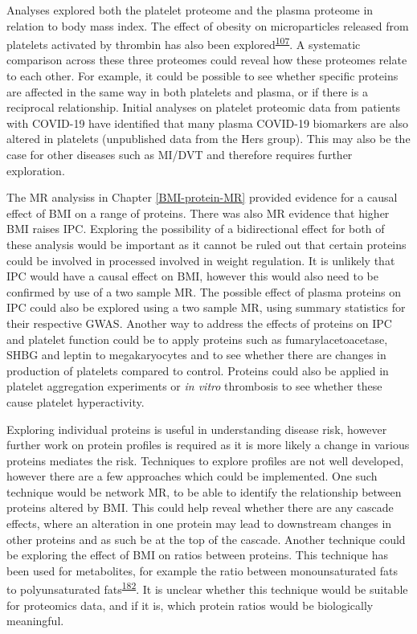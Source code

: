 \documentclass[11pt,twoside]{bristolthesis}
\begin{document}
Analyses explored both the platelet proteome and the plasma proteome in relation to body mass index. The effect of obesity on microparticles released from platelets activated by thrombin has also been explored\textsuperscript{\protect\hyperlink{ref-Grande2019}{107}}. A systematic comparison across these three proteomes could reveal how these proteomes relate to each other. For example, it could be possible to see whether specific proteins are affected in the same way in both platelets and plasma, or if there is a reciprocal relationship. Initial analyses on platelet proteomic data from patients with COVID-19 have identified that many plasma COVID-19 biomarkers are also altered in platelets (unpublished data from the Hers group). This may also be the case for other diseases such as MI/DVT and therefore requires further exploration.

The MR analysiss in Chapter \ref{BMI-protein-MR} provided evidence for a causal effect of BMI on a range of proteins. There was also MR evidence that higher BMI raises IPC. Exploring the possibility of a bidirectional effect for both of these analysis would be important as it cannot be ruled out that certain proteins could be involved in processed involved in weight regulation. It is unlikely that IPC would have a causal effect on BMI, however this would also need to be confirmed by use of a two sample MR. The possible effect of plasma proteins on IPC could also be explored using a two sample MR, using summary statistics for their respective GWAS. Another way to address the effects of proteins on IPC and platelet function could be to apply proteins such as fumarylacetoacetase, SHBG and leptin to megakaryocytes and to see whether there are changes in production of platelets compared to control. Proteins could also be applied in platelet aggregation experiments or \emph{in vitro} thrombosis to see whether these cause platelet hyperactivity.

Exploring individual proteins is useful in understanding disease risk, however further work on protein profiles is required as it is more likely a change in various proteins mediates the risk. Techniques to explore profiles are not well developed, however there are a few approaches which could be implemented. One such technique would be network MR, to be able to identify the relationship between proteins altered by BMI. This could help reveal whether there are any cascade effects, where an alteration in one protein may lead to downstream changes in other proteins and as such be at the top of the cascade. Another technique could be exploring the effect of BMI on ratios between proteins. This technique has been used for metabolites, for example the ratio between monounsaturated fats to polyunsaturated fats\textsuperscript{\protect\hyperlink{ref-Carayol2017c}{182}}. It is unclear whether this technique would be suitable for proteomics data, and if it is, which protein ratios would be biologically meaningful.
\end{document}
